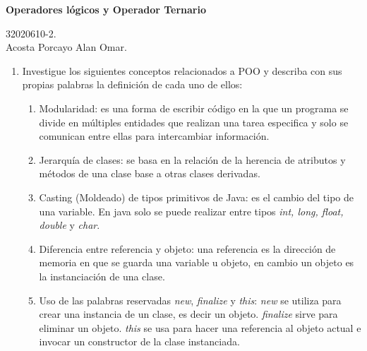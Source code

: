 \documentclass[12pt]{article}
\begin{document}
    \begin{center}
        \large \textbf{Operadores lógicos y Operador Ternario}
    \end{center}
    
    \begin{flushright}
        32020610-2. \\
        Acosta Porcayo Alan Omar.
    \end{flushright}

    \begin{enumerate}[leftmargin=*]
        \item Investigue los siguientes conceptos relacionados a POO y describa con sus propias palabras la definición de cada uno de ellos:
        \begin{enumerate}[leftmargin=*]
            \item Modularidad: es una forma de escribir código en la que un programa se divide en múltiples entidades que realizan una tarea especifica y solo se comunican entre ellas para intercambiar información.
            \item Jerarquía de clases: se basa en la relación de la herencia de atributos y métodos de una clase base a otras clases derivadas.
            \item Casting (Moldeado) de tipos primitivos de Java: es el cambio del tipo de una variable. En java solo se puede realizar entre tipos \textit{int, long, float, double} y \textit{char}.
            \item Diferencia entre referencia y objeto: una referencia es la dirección de memoria en que se guarda una variable u objeto, en cambio un objeto es la instanciación de una clase.
            \item Uso de las palabras reservadas \textit{new}, \textit{finalize} y \textit{this}: \textit{new} se utiliza para crear una instancia de un clase, es decir un objeto. \textit{finalize} sirve para eliminar un objeto. \textit{this} se usa para hacer una referencia al objeto actual e invocar un constructor de la clase instanciada. 
        \end{enumerate}


\end{enumerate}
\end{document}
